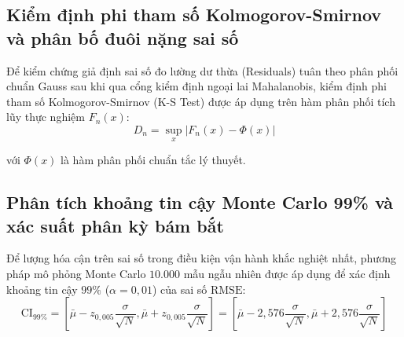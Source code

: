 \subsection{Kiểm định phi tham số Kolmogorov-Smirnov và phân bố đuôi nặng sai số}

\hspace{0.5cm} Để kiểm chứng giả định sai số đo lường dư thừa (Residuals) tuân theo phân phối chuẩn Gauss sau khi qua cổng kiểm định ngoại lai Mahalanobis, kiểm định phi tham số Kolmogorov-Smirnov (K-S Test) được áp dụng trên hàm phân phối tích lũy thực nghiệm $F_n(x)$:
\begin{equation}
D_n = \sup_{x} |F_n(x) - \Phi(x)|
\label{eq:kolmogorov-smirnov-statistic}
\end{equation}

với $\Phi(x)$ là hàm phân phối chuẩn tắc lý thuyết.

\begin{table}[H]
\centering
\caption{Đo đạc thống kê Kolmogorov-Smirnov và hệ số nhọn sai số trên các kịch bản}
\label{tab:ks-test-residual-normality}
\end{table}

\subsection{Phân tích khoảng tin cậy Monte Carlo 99\% và xác suất phân kỳ bám bắt}

\hspace{0.5cm} Để lượng hóa cận trên sai số trong điều kiện vận hành khắc nghiệt nhất, phương pháp mô phỏng Monte Carlo $10.000$ mẫu ngẫu nhiên được áp dụng để xác định khoảng tin cậy $99\%$ ($\alpha = 0{,}01$) của sai số $\text{RMSE}$:
\begin{equation}
\text{CI}_{99\%} = \left[ \bar{\mu} - z_{0{,}005} \frac{\sigma}{\sqrt{N}}, \bar{\mu} + z_{0{,}005} \frac{\sigma}{\sqrt{N}} \right] = \left[ \bar{\mu} - 2{,}576 \frac{\sigma}{\sqrt{N}}, \bar{\mu} + 2{,}576 \frac{\sigma}{\sqrt{N}} \right]
\label{eq:monte-carlo-confidence-bounds-formula}
\end{equation}

